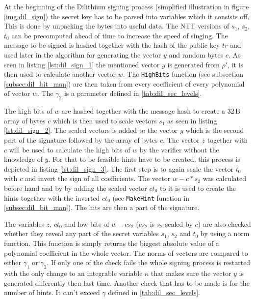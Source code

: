 At the beginning of the Dilithium signing process (simplified illustration in figure \ref{img:dil_sign}) the secret key has to be parsed into variables which it consists off. This is done by unpacking the bytes into useful data. The NTT versions of $s_1$, $s_2$, $t_0$ can be precomputed ahead of time to increase the speed of singing. 
\noindent The message to be signed is hashed together with the hash of the public key $tr$ and used later in the algorithm for generating the vector $y$ and random bytes $c$. As seen in listing \ref{lst:dil_sign_1} the mentioned vector $y$ is generated from $\rho'$, it is then used to calculate another vector $w$. The \texttt{HighBits} function (see subsection \ref{subsec:dil_bit_man}) are then taken from every coefficient of every polynomial of vector $w$. The $\gamma_2$ is a parameter defined in \ref{tab:dil_sec_levels}.

The high bits of $w$ are hashed together with the message hash to create a 32\,B array of bytes $c$ which is then used to scale vectors $s_1$ as seen in listing \ref{lst:dil_sign_2}. The scaled vectors is added to the vector $y$ which is the second part of the signature followed by the array of bytes $c$. 
The vector $z$ together with $c$ will be used to calculate the high bits of $w$ by the verifier without the knowledge of $y$. For that to be feasible hints have to be created, this process is depicted in listing \ref{lst:dil_sign_3}. The first step is to again scale the vector $t_0$ with $c$ and invert the sign of all coefficients. The vector $w-c*s_2$ was calculated before hand and by by adding the scaled vector $ct_0$ to it is used to create the hints together with the inverted $ct_0$ (see \texttt{MakeHint} function in \ref{subsec:dil_bit_man}). The hits are then a part of the signature.
\newpage 
{}

The variables $z$, $ct_0$ and low bits of $w-cs_2$ ($cs_2$ is $s_2$ scaled by $c$) are also checked whether they reveal any part of the secret variables $s_1$, $s_2$ and $t_0$ by using a norm function. This function is simply returns the biggest absolute value of a polynomial coefficient in the whole vector. The norms of vectors are compared to either $\gamma_1$ or $\gamma_2$. If only one of the check fails the whole signing process is restarted with the only change to an integrable variable $\kappa$ that makes sure the vector $y$ is generated differently then last time. Another check that has to be made is for the number of hints. It can't exceed $\gamma$ defined in \ref{tab:dil_sec_levels}.

